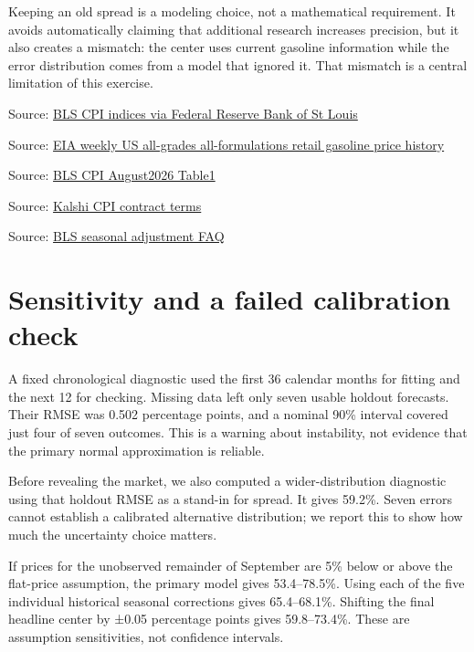\documentclass[11pt]{article}
\begin{document}
Keeping an old spread is a modeling choice, not a mathematical requirement. It avoids automatically claiming that additional research increases precision, but it also creates a mismatch: the center uses current gasoline information while the error distribution comes from a model that ignored it. That mismatch is a central limitation of this exercise.


\par{\small Source: \href{https://fred.stlouisfed.org/graph/fredgraph.csv?id=CPIAUCSL,CUSR0000SETB01,CUUR0000SETB01\&cosd=2021-08-01\&coed=2026-08-01}{BLS CPI indices via Federal Reserve Bank of St Louis}}
\par{\small Source: \href{https://www.eia.gov/dnav/pet/hist\_xls/EMM\_EPM0\_PTE\_NUS\_DPGw.xls}{EIA weekly US all-grades all-formulations retail gasoline price history}}
\par{\small Source: \href{https://www.bls.gov/news.release/cpi.t01.htm}{BLS CPI August2026 Table1}}
\par{\small Source: \href{https://assets.kalshi.com/contract\_terms/CPI.pdf}{Kalshi CPI contract terms}}
\par{\small Source: \href{https://www.bls.gov/cpi/seasonal-adjustment/questions-and-answers.htm}{BLS seasonal adjustment FAQ}}
\section*{\textcolor{epdarkgreen}{Sensitivity and a failed calibration check}}
A fixed chronological diagnostic used the first 36 calendar months for fitting and the next 12 for checking. Missing data left only seven usable holdout forecasts. Their RMSE was 0.502 percentage points, and a nominal 90\% interval covered just four of seven outcomes. This is a warning about instability, not evidence that the primary normal approximation is reliable.


Before revealing the market, we also computed a wider-distribution diagnostic using that holdout RMSE as a stand-in for spread. It gives 59.2\%. Seven errors cannot establish a calibrated alternative distribution; we report this to show how much the uncertainty choice matters.


If prices for the unobserved remainder of September are 5\% below or above the flat-price assumption, the primary model gives 53.4–78.5\%. Using each of the five individual historical seasonal corrections gives 65.4–68.1\%. Shifting the final headline center by ±0.05 percentage points gives 59.8–73.4\%. These are assumption sensitivities, not confidence intervals.
\end{document}
